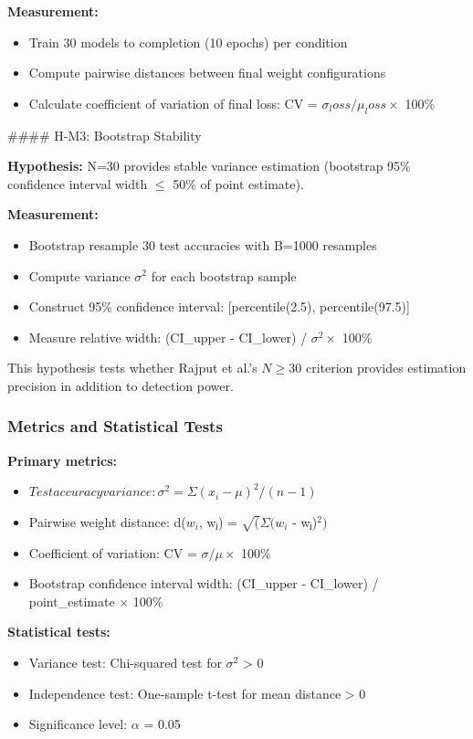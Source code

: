 \textbf{Measurement:}
\begin{itemize}
\item Train 30 models to completion (10 epochs) per condition
\item Compute pairwise distances between final weight configurations
\item Calculate coefficient of variation of final loss: CV = $\sigma _loss / \mu _loss \times$ 100\%
\end{itemize}

\#\#\#\# H-M3: Bootstrap Stability

\textbf{Hypothesis:} N=30 provides stable variance estimation (bootstrap 95\% confidence interval width $\leq$ 50\% of point estimate).

\textbf{Measurement:}
\begin{itemize}
\item Bootstrap resample 30 test accuracies with B=1000 resamples
\item Compute variance $\sigma ^2$ for each bootstrap sample
\item Construct 95\% confidence interval: [percentile(2.5), percentile(97.5)]
\item Measure relative width: (CI\_upper - CI\_lower) / $\sigma ^2 \times$ 100\%
\end{itemize}

This hypothesis tests whether Rajput et al.'s $N\geq 30$ criterion provides estimation precision in addition to detection power.

\subsubsection{Metrics and Statistical Tests}

\textbf{Primary metrics:}
\begin{itemize}
\item $Test accuracy variance: \sigma ^2 = \Sigma (x_i - \mu )^2 / (n-1)$
\item Pairwise weight distance: d($w_i$, wⱼ) = $\sqrt(\Sigma (w_i$ - wⱼ)$^{2})$
\item Coefficient of variation: CV = $\sigma /\mu \times$ 100\%
\item Bootstrap confidence interval width: (CI\_upper - CI\_lower) / point\_estimate $\times$ 100\%
\end{itemize}

\textbf{Statistical tests:}
\begin{itemize}
\item Variance test: Chi-squared test for $\sigma ^2$ > 0
\item Independence test: One-sample t-test for mean distance > 0
\item Significance level: $\alpha$ = 0.05
\end{itemize}
